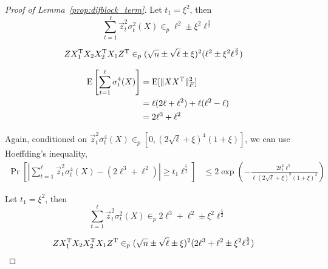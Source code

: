 \begin{proof}[Proof of Lemma~\ref{prop:difblock_term}]
Let $t_1 = \xi^2$, then
\begin{equation}
    \sum^{\ell}_{t = 1}\vec z^2_{t}\sigma^{2}_{t}(X) \in_p  \ell^2  \pm \xi^2 \ell^{\frac{3}{2}}
\end{equation}

\begin{equation}
\begin{split}
    Z X_1^{\mathrm{T}}X_2X_2^{\mathrm{T}}X_1Z^{\mathrm{T}}
    &\in_p (\sqrt{n} \pm \sqrt{\ell} \pm \xi)^{2}(\ell^2  \pm \xi^2 \ell^{\frac{3}{2}})
\end{split}
\end{equation}

\begin{equation}
\begin{split}
    \mathrm{E}\left[\sum^{\ell}_{t = 1}\sigma^{4}_{t}(X) \right]  
    &=\mathrm{E}[ \|X X^{\mathrm{T}} \|^2_F]  \\ 
    &= \ell(2\ell+\ell^2) + \ell(\ell^2-\ell) \\ 
    &= 2\ell^3 + \ell^2
\end{split}
\end{equation}

Again, conditioned on $\vec z^2_{t}\sigma^{4}_{t}(X)
      \in_p \left[0,  (2\sqrt{\ell}+\xi)^4(1+\xi) \right]$, we can use Hoeffding's inequality,
\begin{equation}
\begin{split}
    \Pr\left[ \left|\sum^{\ell}_{t = 1}\vec z^2_{t}\sigma^{4}_{t}(X) - (2\ell^3 + \ell^2) \right| \geq t_1 \ell^{\frac{5}{2}} \right]
    &\leq   2\exp \left(-\frac{2t_1^2\ell^5}{\ell(2\sqrt{\ell}+\xi)^8 (1+\xi)^2 } \right)      
\end{split}
\end{equation}

Let $t_1 = \xi^2$, then
\begin{equation}
    \sum^{\ell}_{t = 1}\vec z^2_{t}\sigma^{2}_{t}(X) \in_p  2\ell^3 + \ell^2 \pm \xi^2 \ell^{\frac{5}{2}}
\end{equation}

\begin{equation}
\begin{split}
    Z X_1^{\mathrm{T}}X_2X_2^{\mathrm{T}}X_1Z^{\mathrm{T}}
    &\in_p (\sqrt{n} \pm \sqrt{\ell} \pm \xi)^{2}(2\ell^3 + \ell^2 \pm \xi^2 \ell^{\frac{5}{2}})
\end{split}
\end{equation}


\end{proof}

